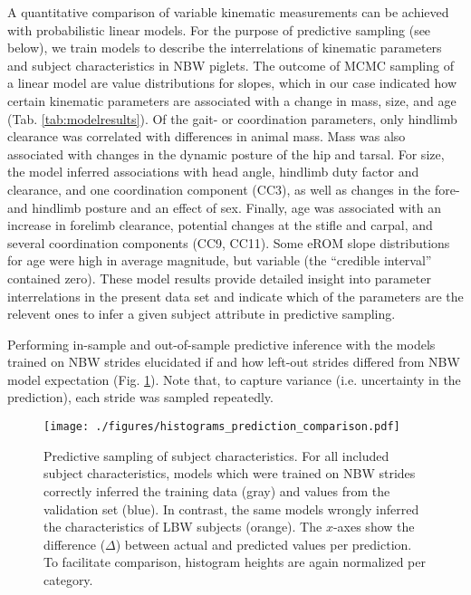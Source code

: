A quantitative comparison of variable kinematic measurements can be achieved with probabilistic linear models.
For the purpose of predictive sampling (see below), we train models to describe the interrelations of kinematic parameters and subject characteristics in NBW piglets.
The outcome of MCMC sampling of a linear model are value distributions for slopes, which in our case indicated how certain kinematic parameters are associated with a change in mass, size, and age (Tab. \ref{tab:modelresults}).
Of the gait- or coordination parameters, only hindlimb clearance was correlated with differences in animal mass.
Mass was also associated with changes in the dynamic posture of the hip and tarsal.
For size, the model inferred associations with head angle, hindlimb duty factor and clearance, and one coordination component (CC3), as well as changes in the fore- and hindlimb posture and an effect of sex.
Finally, age was associated with an increase in forelimb clearance, potential changes at the stifle and carpal, and several coordination components (CC9, CC11).
Some eROM slope distributions for age were high in average magnitude, but variable (the ``credible interval'' contained zero).
These model results provide detailed insight into parameter interrelations in the present data set and indicate which of the parameters are the relevent ones to infer a given subject attribute in predictive sampling.



\bigskip

Performing in-sample and out-of-sample predictive inference with the models trained on NBW strides elucidated if and how left-out strides differed from NBW model expectation (Fig. \ref{fig:predictions}).
Note that, to capture variance (i.e. uncertainty in the prediction), each stride was sampled repeatedly.

\begin{figure}[p]
\centering
\texttt{[image: ./figures/histograms\_prediction\_comparison.pdf]}
\caption{\label{fig:predictions}Predictive sampling of subject characteristics. For all included subject characteristics, models which were trained on NBW strides correctly inferred the training data (gray) and values from the validation set (blue). In contrast, the same models wrongly inferred the characteristics of LBW subjects (orange). The \(x\)-axes show the difference (\(\Delta\)) between actual and predicted values per prediction. To facilitate comparison, histogram heights are again normalized per category.}
\end{figure}


